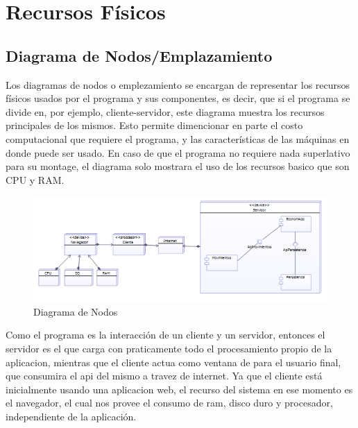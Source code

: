 \chapter{Recursos Físicos}
\section{Diagrama de Nodos/Emplazamiento}

Los diagramas de nodos o emplezamiento se encargan de representar los recursos físicos usados por el programa y sus componentes, es decir, que si el programa se divide en, por ejemplo, cliente-servidor, este diagrama muestra los recursos principales de los mismos. Esto permite dimencionar en parte el costo computacional que requiere el programa, y las características de las máquinas en donde puede ser usado. En caso de que el programa no requiere nada superlativo para su montage, el diagrama solo mostrara el uso de los recursos basico que son CPU y RAM.

\begin{figure}[H]
	\centering
	\includegraphics[width=1\linewidth]{parte2/imgs/DiagramaDeNodos/Nodos}
	\caption{Diagrama de Nodos}
	\label{fig:nodos}
\end{figure}

Como el programa es la interacción de un cliente y un servidor, entonces el servidor es el que carga con praticamente todo el procesamiento propio de la aplicacion, mientras que el cliente actua como ventana de para el usuario final, que consumira el api del mismo a travez de internet. Ya que el cliente está inicialmente usando una aplicacion web, el recurso del sistema en ese momento es el navegador, el cual nos provee el consumo de ram, disco duro y procesador, independiente de la aplicación.
